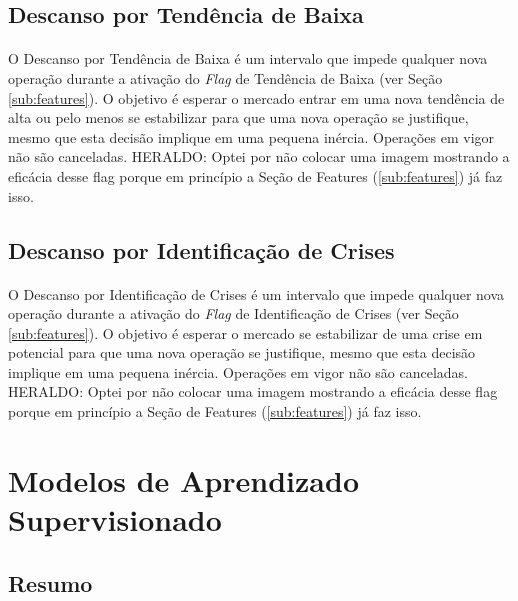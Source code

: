 \FloatBarrier
\subsection{Descanso por Tendência de Baixa}
\label{sub:downtrend_halt}

\paragraph{} O Descanso por Tendência de Baixa é um intervalo que impede qualquer nova operação durante a ativação do \textit{Flag} de Tendência de Baixa (ver Seção \ref{sub:features}). O objetivo é esperar o mercado entrar em uma nova tendência de alta ou pelo menos se estabilizar para que uma nova operação se justifique, mesmo que esta decisão implique em uma pequena inércia. Operações em vigor não são canceladas. \color{red} HERALDO: Optei por não colocar uma imagem mostrando a eficácia desse flag porque em princípio a Seção de Features (\ref{sub:features}) já faz isso. \color{black}



\FloatBarrier
\subsection{Descanso por Identificação de Crises}
\label{sub:crisis_halt}

\paragraph{} O Descanso por Identificação de Crises é um intervalo que impede qualquer nova operação durante a ativação do \textit{Flag} de Identificação de Crises (ver Seção \ref{sub:features}). O objetivo é esperar o mercado se estabilizar de uma crise em potencial para que uma nova operação se justifique, mesmo que esta decisão implique em uma pequena inércia. Operações em vigor não são canceladas. \color{red} HERALDO: Optei por não colocar uma imagem mostrando a eficácia desse flag porque em princípio a Seção de Features (\ref{sub:features}) já faz isso. \color{black}



\FloatBarrier
\section{Modelos de Aprendizado Supervisionado}



\FloatBarrier
\subsection{Resumo}

